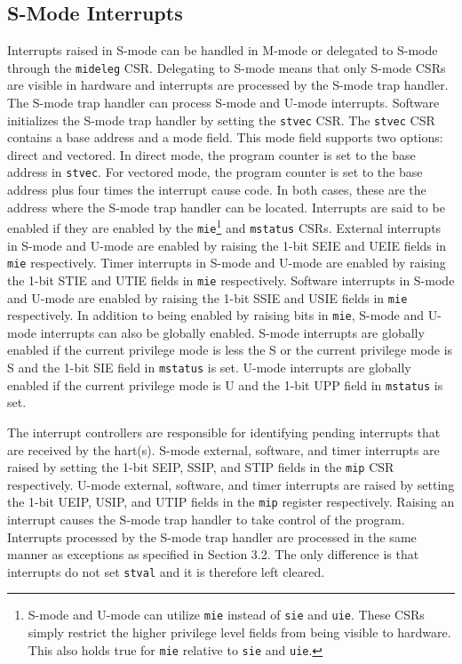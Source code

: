 \documentclass[12pt]{article}
\begin{document}
\subsection{S-Mode Interrupts}
Interrupts raised in S-mode can be handled in M-mode or delegated to S-mode through the {\tt{mideleg}} CSR. Delegating to S-mode means that only S-mode CSRs are visible in hardware and interrupts are processed by the S-mode trap handler. The S-mode trap handler can process S-mode and U-mode interrupts. Software initializes the S-mode trap handler by setting the {\tt{stvec}} CSR. The {\tt{stvec}} CSR contains a base address and a mode field. This mode field supports two options: direct and vectored. In direct mode, the program counter is set to the base address in {\tt{stvec}}. For vectored mode, the program counter is set to the base address plus four times the interrupt cause code. In both cases, these are the address where the S-mode trap handler can be located. Interrupts are said to be enabled if they are enabled by the {\tt{mie}}\footnote[5]{S-mode and U-mode can utilize {\tt{mie}} instead of {\tt{sie}} and {\tt{uie}}. These CSRs simply restrict the higher privilege level fields from being visible to hardware. This also holds true for {\tt{mie}} relative to {\tt{sie}} and {\tt{uie}}.} and {\tt{mstatus}} CSRs. External interrupts in S-mode and U-mode are enabled by raising the 1-bit SEIE and UEIE fields in {\tt{mie}} respectively. Timer interrupts in S-mode and U-mode are enabled by raising the 1-bit STIE and UTIE fields in {\tt{mie}} respectively. Software interrupts in S-mode and U-mode are enabled by raising the 1-bit SSIE and USIE fields in {\tt{mie}} respectively. In addition to being enabled by raising bits in {\tt{mie}}, S-mode and U-mode interrupts can also be globally enabled. S-mode interrupts are globally enabled if the current privilege mode is less the S or the current privilege mode is S and the 1-bit SIE field in {\tt{mstatus}} is set. U-mode interrupts are globally enabled if the current privilege mode is U and the 1-bit UPP field in {\tt{mstatus}} is set.

The interrupt controllers are responsible for identifying pending interrupts that are received by the hart(s). S-mode external, software, and timer interrupts are raised by setting the 1-bit SEIP, SSIP, and STIP fields in the {\tt{mip}} CSR respectively. U-mode external, software, and timer interrupts are raised by setting the 1-bit UEIP, USIP, and UTIP fields in the {\tt{mip}} register respectively. Raising an interrupt causes the S-mode trap handler to take control of the program. Interrupts processed by the S-mode trap handler are processed in the same manner as exceptions as specified in Section 3.2. The only difference is that interrupts do not set {\tt{stval}} and it is therefore left cleared. 
\end{document}
